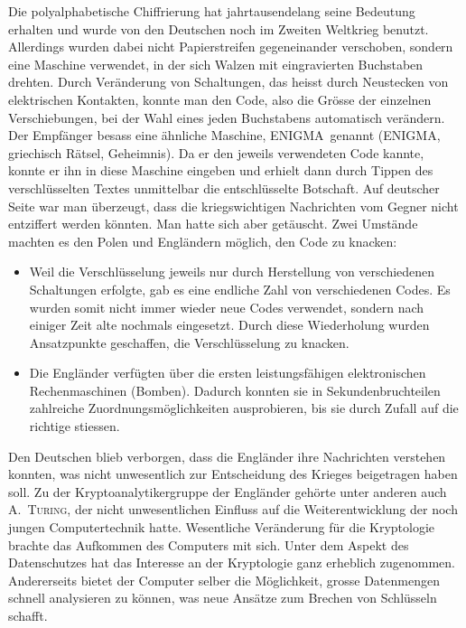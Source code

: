 \documentclass[%
11pt,%
twoside,%
titlepage,%
german,%
headsepline%
]{scrartcl}
\begin{document}
Die polyalphabetische Chiffrierung hat jahrtausendelang seine Bedeutung erhalten und wurde von den Deutschen noch im Zweiten Weltkrieg benutzt. Allerdings wurden dabei nicht Papierstreifen gegeneinander verschoben, sondern eine Maschine verwendet, in der sich Walzen mit eingravierten Buchstaben drehten. Durch Veränderung von Schaltungen, das heisst durch Neustecken von elektrischen Kontakten, konnte man den Code, also die Gr\"osse der einzelnen Verschiebungen, bei der Wahl eines jeden Buchstabens automatisch verändern. Der Empfänger besass eine ähnliche Maschine, \glqq ENIGMA\grqq\ genannt (ENIGMA, griechisch Rätsel, Geheimnis). Da er den jeweils verwendeten Code kannte, konnte er ihn in diese Maschine eingeben und erhielt dann durch Tippen des verschlüsselten Textes unmittelbar die entschlüsselte Botschaft. Auf deutscher Seite war man überzeugt, dass die kriegswichtigen Nachrichten vom Gegner nicht entziffert werden könnten. Man hatte sich aber getäuscht. Zwei Umstände machten es den Polen und Engländern möglich, den Code zu knacken:
\begin{itemize}
\item Weil die Verschlüsselung jeweils nur durch Herstellung von verschiedenen Schaltungen erfolgte, gab es eine endliche Zahl von verschiedenen Codes. Es wurden somit nicht immer wieder neue Codes verwendet, sondern nach einiger Zeit alte nochmals eingesetzt. Durch diese Wiederholung wurden Ansatzpunkte geschaffen, die Verschlüsselung zu knacken.
\item Die Engländer verfügten über die ersten leistungsfähigen elektronischen	Rechenmaschinen (Bomben). Dadurch konnten sie in Sekundenbruchteilen zahlreiche Zu\-ord\-nungs\-m\"og\-lich\-kei\-ten ausprobieren, bis sie durch Zufall auf die richtige stiessen.
\end{itemize}
Den Deutschen blieb verborgen, dass die Engländer ihre Nachrichten verstehen konnten, was nicht unwesentlich zur Entscheidung des Krieges beigetragen haben soll. Zu der Kryptoanalytikergruppe der Engländer geh\"orte unter anderen auch \textsc{A.~Turing}, der nicht unwesentlichen Einfluss auf die Weiterentwicklung der noch jungen Computertechnik hatte. Wesentliche Veränderung für die Kryptologie brachte das Aufkommen des Computers mit sich. Unter dem Aspekt des Datenschutzes hat das Interesse an der Kryptologie ganz erheblich zugenommen. Andererseits bietet der Computer selber die Möglichkeit, grosse Datenmengen schnell analysieren zu k\"onnen, was neue Ansätze zum Brechen von Schlüsseln schafft.

\clearpage
\end{document}
